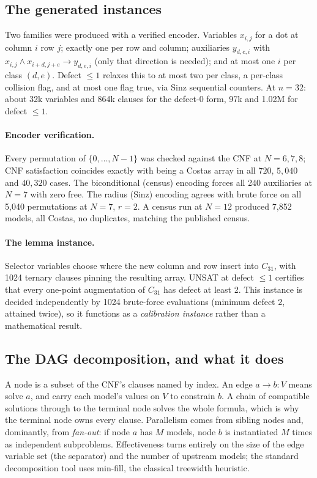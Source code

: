 \documentclass[11pt,a4paper]{article}
\theoremstyle{definition}
\begin{document}
\subsection{The generated instances}

Two families were produced with a verified encoder. Variables $x_{i,j}$ for a dot
at column $i$ row $j$; exactly one per row and column; auxiliaries $y_{d,e,i}$
with $x_{i,j}\wedge x_{i+d,j+e}\to y_{d,e,i}$ (only that direction is needed);
and at most one $i$ per class $(d,e)$. Defect $\le1$ relaxes this to at most two
per class, a per-class collision flag, and at most one flag true, via Sinz
sequential counters. At $n=32$: about 32k variables and 864k clauses for the
defect-0 form, 97k and 1.02M for defect $\le1$.

\paragraph{Encoder verification.} Every permutation of $\{0,\dots,N-1\}$ was
checked against the CNF at $N=6,7,8$; CNF satisfaction coincides exactly with
being a Costas array in all $720$, $5{,}040$ and $40{,}320$ cases. The
biconditional (census) encoding forces all 240 auxiliaries at $N=7$ with zero
free. The radius (Sinz) encoding agrees with brute force on all 5{,}040
permutations at $N=7$, $r=2$. A census run at $N=12$ produced 7{,}852 models, all
Costas, no duplicates, matching the published census.

\paragraph{The lemma instance.} Selector variables choose where the new column and
row insert into $C_{31}$, with 1024 ternary clauses pinning the resulting array.
UNSAT at defect $\le1$ certifies that every one-point augmentation of $C_{31}$
has defect at least 2. This instance is decided independently by 1024
brute-force evaluations (minimum defect 2, attained twice), so it functions as a
\emph{calibration instance} rather than a mathematical result.

\subsection{The DAG decomposition, and what it does}

A node is a subset of the CNF's clauses named by index. An edge $a\to b:V$ means
solve $a$, and carry each model's values on $V$ to constrain $b$. A chain of
compatible solutions through to the terminal node solves the whole formula, which
is why the terminal node owns every clause. Parallelism comes from sibling nodes
and, dominantly, from \emph{fan-out}: if node $a$ has $M$ models, node $b$ is
instantiated $M$ times as independent subproblems. Effectiveness turns entirely
on the size of the edge variable set (the separator) and the number of upstream
models; the standard decomposition tool uses min-fill, the classical treewidth
heuristic.
\end{document}
